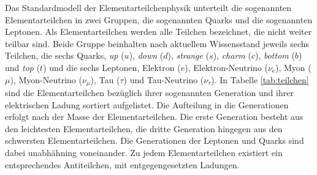Das Standardmodell der Elementarteilchenphysik unterteilt die sogenannten Elementarteilchen in zwei Gruppen, die sogenannten Quarks und die sogenannten Leptonen.
Als Elementarteilchen werden alle Teilchen bezeichnet, die nicht weiter teilbar sind.
Beide Gruppe beinhalten nach aktuellem Wissensstand jeweils sechs Teilchen, die sechs Quarks, \textit{up} ($u$), \textit{down} ($d$), \textit{strange} ($s$), \textit{charm} ($c$), \textit{bottom} ($b$) und \textit{top} ($t$) und die sechs Leptonen, Elektron ($e$), Elektron-Neutrino ($\nu_\text{e}$), Myon ($\mu$), Myon-Neutrino ($\nu_{\mu}$), Tau ($\tau$) und Tau-Neutrino ($\nu_{\tau}$).
In Tabelle \ref{tab:teilchen} sind die Elementarteilchen bez\"uglich ihrer sogenannten Generation und ihrer elektrischen Ladung sortiert aufgelistet.
Die Aufteilung in die Generationen erfolgt nach der Masse der Elementarteilchen.
Die erste Generation besteht aus den leichtesten Elementarteilchen, die dritte Generation hingegen aus den schwersten Elementarteilchen.
Die Generationen der Leptonen und Quarks sind dabei unabh\"ahning voneinander.
Zu jedem Elementarteilchen existiert ein  entsprechendes Antiteilchen, mit entgegengesetzten Ladungen.

